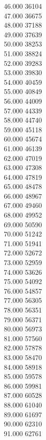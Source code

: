{ 46.000	36104 \\
 47.000	36675 \\
 48.000	37188 \\
 49.000	37639 \\
 50.000	38253 \\
 51.000	38824 \\
 52.000	39283 \\
 53.000	39830 \\
 54.000	40459 \\
 55.000	40849 \\
 56.000	44009 \\
 57.000	44339 \\
 58.000	44740 \\
 59.000	45118 \\
 60.000	45674 \\
 61.000	46139 \\
 62.000	47019 \\
 63.000	47308 \\
 64.000	47819 \\
 65.000	48478 \\
 66.000	48967 \\
 67.000	49460 \\
 68.000	49952 \\
 69.000	50590 \\
 70.000	51242 \\
 71.000	51941 \\
 72.000	52672 \\
 73.000	52959 \\
 74.000	53626 \\
 75.000	54092 \\
 76.000	54857 \\
 77.000	56305 \\
 78.000	56351 \\
 79.000	56371 \\
 80.000	56973 \\
 81.000	57560 \\
 82.000	57878 \\
 83.000	58470 \\
 84.000	58918 \\
 85.000	59578 \\
 86.000	59981 \\
 87.000	60528 \\
 88.000	61040 \\
 89.000	61697 \\
 90.000	62310 \\
 91.000	62761 \\
}
